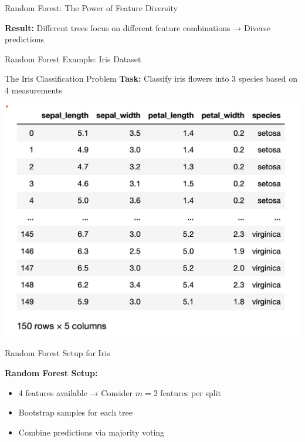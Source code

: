 \documentclass[9pt]{beamer}
\newcommand{\fitpic}[1]{\begin{adjustbox}{max width=\linewidth, max totalheight=0.78\textheight}#1\end{adjustbox}}
\begin{document}
\begin{frame}{Random Forest: The Power of Feature Diversity}
\begin{keypointsbox}
\textbf{Result:} Different trees focus on different feature combinations → Diverse predictions
\end{keypointsbox}
\end{frame}

\begin{frame}{Random Forest Example: Iris Dataset}
\begin{examplebox}{The Iris Classification Problem}
\textbf{Task:} Classify iris flowers into 3 species based on 4 measurements
\end{examplebox}

  \vspace{0.3cm}
  \centering
  \fitpic{\includegraphics[scale=0.5]{../assets/ensemble/diagrams/dataset-iris.png}}
\end{frame}

\begin{frame}{Random Forest Setup for Iris}
\begin{keypointsbox}
\textbf{Random Forest Setup:}
\begin{itemize}
\item 4 features available → Consider $m = 2$ features per split
\item Bootstrap samples for each tree
\item Combine predictions via majority voting
\end{itemize}
\end{keypointsbox}
\end{frame}
\end{document}
